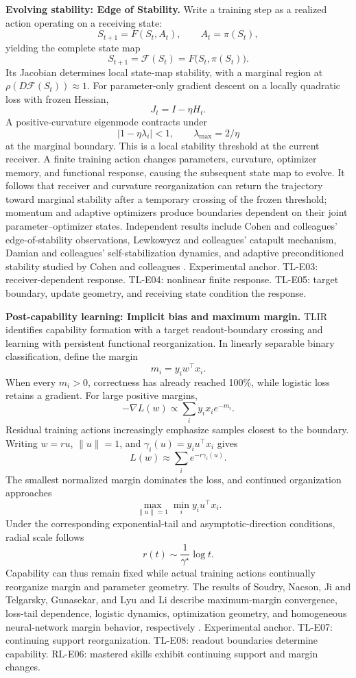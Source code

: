 \documentclass[12pt,letterpaper]{article}
\begin{document}
\medskip\noindent\textbf{Evolving stability: Edge of Stability.}
Write a training step as a realized action operating on a receiving state:
\[
S_{t+1}=F(S_t,A_t),\qquad A_t=\pi(S_t),
\]
yielding the complete state map
\[
S_{t+1}=\mathcal F(S_t)=F\bigl(S_t,\pi(S_t)\bigr).
\]
Its Jacobian determines local state-map stability, with a marginal region at $\rho(D\mathcal F(S_t))\approx1$. For parameter-only gradient descent on a locally quadratic loss with frozen Hessian,
\[
J_t=I-\eta H_t.
\]
A positive-curvature eigenmode contracts under
\[
|1-\eta\lambda_i|<1,\qquad \lambda_{\max}=2/\eta
\]
at the marginal boundary. This is a local stability threshold at the current receiver. A finite training action changes parameters, curvature, optimizer memory, and functional response, causing the subsequent state map to evolve. It follows that receiver and curvature reorganization can return the trajectory toward marginal stability after a temporary crossing of the frozen threshold; momentum and adaptive optimizers produce boundaries dependent on their joint parameter--optimizer states. Independent results include Cohen and colleagues' edge-of-stability observations, Lewkowycz and colleagues' catapult mechanism, Damian and colleagues' self-stabilization dynamics, and adaptive preconditioned stability studied by Cohen and colleagues \cite{cohen2021,lewkowycz2020,damian2023,cohen2022adaptive}.
Experimental anchor. TL-E03: receiver-dependent response. TL-E04: nonlinear finite response. TL-E05: target boundary, update geometry, and receiving state condition the response.

\medskip\noindent\textbf{Post-capability learning: Implicit bias and maximum margin.}
TLIR identifies capability formation with a target readout-boundary crossing and learning with persistent functional reorganization. In linearly separable binary classification, define the margin
\[
m_i=y_i w^\top x_i.
\]
When every $m_i>0$, correctness has already reached 100\%, while logistic loss retains a gradient. For large positive margins,
\[
-\nabla L(w)\propto\sum_i y_i x_i e^{-m_i}.
\]
Residual training actions increasingly emphasize samples closest to the boundary. Writing $w=ru$, $\|u\|=1$, and $\gamma_i(u)=y_i u^\top x_i$ gives
\[
L(w)\approx\sum_i e^{-r\gamma_i(u)}.
\]
The smallest normalized margin dominates the loss, and continued organization approaches
\[
\max_{\|u\|=1}\min_i y_i u^\top x_i.
\]
Under the corresponding exponential-tail and asymptotic-direction conditions, radial scale follows
\[
r(t)\sim\frac{1}{\gamma^\star}\log t.
\]
Capability can thus remain fixed while actual training actions continually reorganize margin and parameter geometry. The results of Soudry, Nacson, Ji and Telgarsky, Gunasekar, and Lyu and Li describe maximum-margin convergence, loss-tail dependence, logistic dynamics, optimization geometry, and homogeneous neural-network margin behavior, respectively \cite{soudry2018,nacson2019,ji2019,gunasekar2018,lyu2020}.
Experimental anchor. TL-E07: continuing support reorganization. TL-E08: readout boundaries determine capability. RL-E06: mastered skills exhibit continuing support and margin changes.
\end{document}
